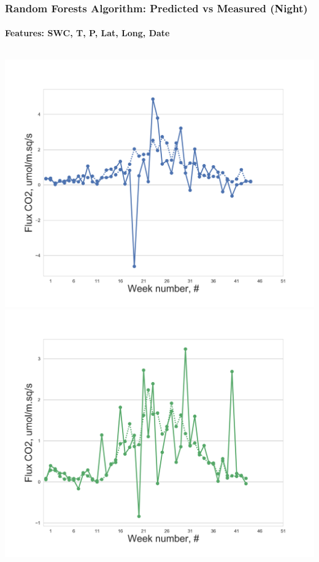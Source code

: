 \documentclass{beamer}
\begin{document}
\begin{frame}
\frametitle{Random Forests Algorithm: Predicted vs Measured (Night)}
\framesubtitle{Features: SWC, T, P, Lat, Long, Date}
\begin{columns}[t]
\centering
\includegraphics[width=\textwidth]{F_ML/0.png}\\
\includegraphics[width=\textwidth]{F_ML/1.png}


\end{columns}
\end{frame}
\end{document}
